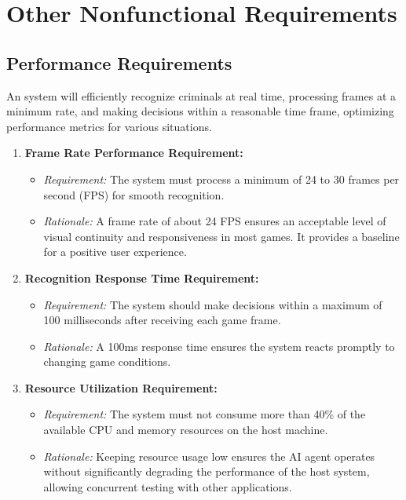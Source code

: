 \documentclass{scrreprt}
\begin{document}
\chapter{Other Nonfunctional Requirements}
    \section{Performance Requirements}
        An system will efficiently recognize criminals at real time, processing frames at a minimum rate, and making decisions within a reasonable time frame, optimizing performance metrics for various situations.
        \begin{enumerate}
            \item \textbf{Frame Rate Performance Requirement:}
                \begin{itemize}
                    \item \textit{Requirement:} The system must process a minimum of 24 to 30 frames per second (FPS) for smooth recognition.
                    \item \textit{Rationale:} A frame rate of about 24 FPS ensures an acceptable level of visual continuity and responsiveness in most games. It provides a baseline for a positive user experience.
                \end{itemize}
            \item \textbf{Recognition Response Time Requirement:}
                \begin{itemize}
                    \item \textit{Requirement:} The system should make decisions within a maximum of 100 milliseconds after receiving each game frame.
                    \item \textit{Rationale:} A 100ms response time ensures the system reacts promptly to changing game conditions.
                \end{itemize}
            \item \textbf{Resource Utilization Requirement:}
                \begin{itemize}
                    \item \textit{Requirement:} The system must not consume more than 40\% of the available CPU and memory resources on the host machine.
                    \item \textit{Rationale:} Keeping resource usage low ensures the AI agent operates without significantly degrading the performance of the host system, allowing concurrent testing with other applications.

\end{itemize}
\end{enumerate}
\end{document}
